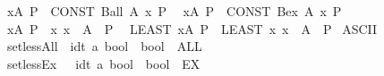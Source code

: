 \begin{isabellebody}
\isanewline
{}\isamarkupfalse%
\isanewline
\ \ {\isachardoublequoteopen}{\isasymforall}x{\isasymin}A{\isachardot}{\kern0pt}\ P{\isachardoublequoteclose}\ {\isasymrightleftharpoons}\ {\isachardoublequoteopen}CONST\ Ball\ A\ {\isacharparenleft}{\kern0pt}{\isasymlambda}x{\isachardot}{\kern0pt}\ P{\isacharparenright}{\kern0pt}{\isachardoublequoteclose}\isanewline
\ \ {\isachardoublequoteopen}{\isasymexists}x{\isasymin}A{\isachardot}{\kern0pt}\ P{\isachardoublequoteclose}\ {\isasymrightleftharpoons}\ {\isachardoublequoteopen}CONST\ Bex\ A\ {\isacharparenleft}{\kern0pt}{\isasymlambda}x{\isachardot}{\kern0pt}\ P{\isacharparenright}{\kern0pt}{\isachardoublequoteclose}\isanewline
\ \ {\isachardoublequoteopen}{\isasymexists}{\isacharbang}{\kern0pt}x{\isasymin}A{\isachardot}{\kern0pt}\ P{\isachardoublequoteclose}\ {\isasymrightharpoonup}\ {\isachardoublequoteopen}{\isasymexists}{\isacharbang}{\kern0pt}x{\isachardot}{\kern0pt}\ x\ {\isasymin}\ A\ {\isasymand}\ P{\isachardoublequoteclose}\isanewline
\ \ {\isachardoublequoteopen}LEAST\ x{\isacharcolon}{\kern0pt}A{\isachardot}{\kern0pt}\ P{\isachardoublequoteclose}\ {\isasymrightharpoonup}\ {\isachardoublequoteopen}LEAST\ x{\isachardot}{\kern0pt}\ x\ {\isasymin}\ A\ {\isasymand}\ P{\isachardoublequoteclose}\isanewline
\isanewline
{}\isamarkupfalse%
\ {\isacharparenleft}{\kern0pt}ASCII\ \isanewline
\ \ {\isachardoublequoteopen}{\isacharunderscore}{\kern0pt}setlessAll{\isachardoublequoteclose}\ {\isacharcolon}{\kern0pt}{\isacharcolon}{\kern0pt}\ {\isachardoublequoteopen}{\isacharbrackleft}{\kern0pt}idt{\isacharcomma}{\kern0pt}\ {\isacharprime}{\kern0pt}a{\isacharcomma}{\kern0pt}\ bool{\isacharbrackright}{\kern0pt}\ {\isasymRightarrow}\ bool{\isachardoublequoteclose}\ \ {\isacharparenleft}{\kern0pt}{\isachardoublequoteopen}{\isacharparenleft}{\kern0pt}{}ALL\ {\isacharunderscore}{\kern0pt}{\isacharless}{\kern0pt}{\isacharunderscore}{\kern0pt}{\isachardot}{\kern0pt}{\isacharslash}{\kern0pt}\ {\isacharunderscore}{\kern0pt}{\isacharparenright}{\kern0pt}{\isachardoublequoteclose}\ \ {\isacharbrackleft}{\kern0pt}{}{\isacharcomma}{\kern0pt}\ {}{\isacharcomma}{\kern0pt}\ {}{}{\isacharbrackright}{\kern0pt}\ {}{}{\isacharparenright}{\kern0pt}\isanewline
\ \ {\isachardoublequoteopen}{\isacharunderscore}{\kern0pt}setlessEx{\isachardoublequoteclose}\ \ {\isacharcolon}{\kern0pt}{\isacharcolon}{\kern0pt}\ {\isachardoublequoteopen}{\isacharbrackleft}{\kern0pt}idt{\isacharcomma}{\kern0pt}\ {\isacharprime}{\kern0pt}a{\isacharcomma}{\kern0pt}\ bool{\isacharbrackright}{\kern0pt}\ {\isasymRightarrow}\ bool{\isachardoublequoteclose}\ \ {\isacharparenleft}{\kern0pt}{\isachardoublequoteopen}{\isacharparenleft}{\kern0pt}{}EX\ {\isacharunderscore}{\kern0pt}{\isacharless}{\kern0pt}{\isacharunderscore}{\kern0pt}{\isachardot}{\kern0pt}{\isacharslash}{\kern0pt}\ {\isacharunderscore}{\kern0pt}{\isacharparenright}{\kern0pt}{\isachardoublequoteclose}\ \ {\isacharbrackleft}{\kern0pt}{}{\isacharcomma}{\kern0pt}\ {}{\isacharcomma}{\kern0pt}\ {}{}{\isacharbrackright}{\kern0pt}\ {}{}{\isacharparenright}{\kern0pt}\isanewline

\end{isabellebody}
